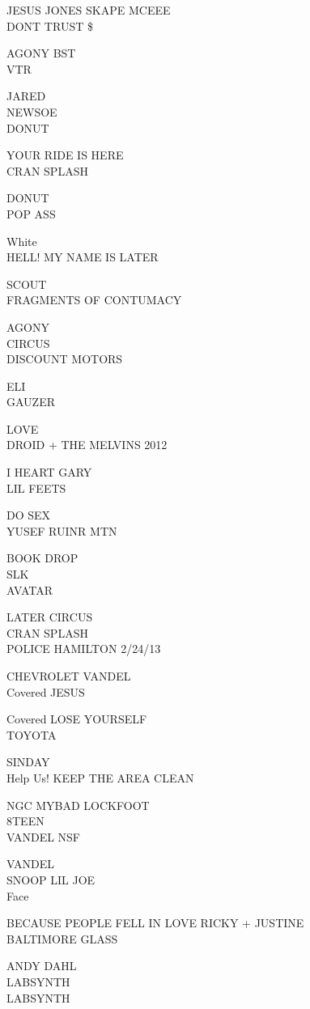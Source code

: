 \documentclass[10pt,letterpaper]{article}
\begin{document}
JESUS JONES SKAPE MCEEE\\
DONT TRUST \$

AGONY BST\\
VTR

JARED\\
NEWSOE\\
DONUT

YOUR RIDE IS HERE\\
CRAN SPLASH

DONUT\\
POP ASS

White\\
HELL! MY NAME IS LATER

SCOUT\\
FRAGMENTS OF CONTUMACY

AGONY\\
CIRCUS\\
DISCOUNT MOTORS

ELI\\
GAUZER

LOVE\\
DROID + THE MELVINS 2012

I HEART GARY\\
LIL FEETS

DO SEX\\
YUSEF RUINR MTN

BOOK DROP\\
SLK\\
AVATAR

LATER CIRCUS\\
CRAN SPLASH\\
POLICE HAMILTON 2/24/13

CHEVROLET VANDEL\\
Covered JESUS

Covered LOSE YOURSELF\\
TOYOTA

SINDAY\\
Help Us! KEEP THE AREA CLEAN

NGC MYBAD LOCKFOOT\\
8TEEN\\
VANDEL NSF

VANDEL\\
SNOOP LIL JOE\\
Face

BECAUSE PEOPLE FELL IN LOVE RICKY + JUSTINE\\
BALTIMORE GLASS

ANDY DAHL\\
LABSYNTH\\
LABSYNTH
\end{document}
